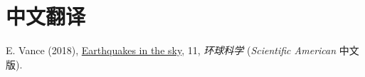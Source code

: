 \section*{中文翻译}

\begin{etaremune}
\item
    E. Vance (2018), \href{https://huanqiukexue.com/a/zazhi/2018/2018/1130/28180.html}{Earthquakes in the sky}, 11,
    \textit{环球科学} (\textit{Scientific American} 中文版).
\end{etaremune}
